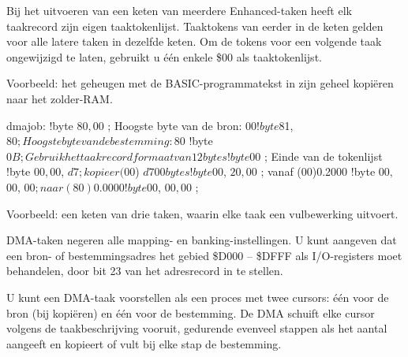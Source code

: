 Bij het uitvoeren van een keten van meerdere Enhanced-taken heeft elk taakrecord zijn eigen taaktokenlijst. Taaktokens van eerder in de keten gelden voor alle latere taken in dezelfde keten. Om de tokens voor een volgende taak ongewijzigd te laten, gebruikt u één enkele \$00 als taaktokenlijst.

Voorbeeld: het geheugen met de BASIC-programmatekst in zijn geheel kopiëren naar het zolder-RAM.

\begin{asmcodesmall}
dmajob:
!byte $80, $00       ; Hoogste byte van de bron: $00
!byte $81, $80       ; Hoogste byte van de bestemming: $80
!byte $0B            ; Gebruik het taakrecordformaat van 12 bytes
!byte $00            ; Einde van de tokenlijst
!byte $00, $00, $d7  ; kopieer ($00) $d700 bytes
!byte $00, $20, $00  ; vanaf (00)0.2000
!byte $00, $00, $00  ; naar (80)0.0000
!byte $00, $00, $00  ;
\end{asmcodesmall}

Voorbeeld: een keten van drie taken, waarin elke taak een vulbewerking uitvoert.


DMA-taken negeren alle mapping- en banking-instellingen. U kunt aangeven dat een bron- of bestemmingsadres het gebied \$D000 -- \$DFFF als I/O-registers moet behandelen, door bit 23 van het adresrecord in te stellen.

U kunt een DMA-taak voorstellen als een proces met twee cursors: één voor de bron (bij kopiëren) en één voor de bestemming. De DMA schuift elke cursor volgens de taakbeschrijving vooruit, gedurende evenveel stappen als het aantal aangeeft en kopieert of vult bij elke stap de bestemming.

